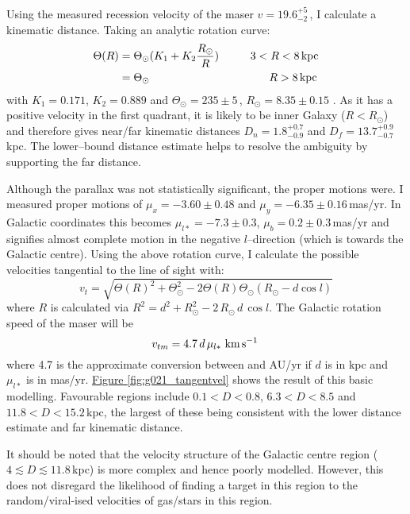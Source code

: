             Using the measured recession velocity of the maser $v=19.6^{+5}_{-2}$\,\kms, I calculate a kinematic distance. Taking an analytic rotation curve:
            \begin{align*}
	            \Theta(R) &= \Theta_\odot (K_1 + K_2\frac{R_\odot}{R}) \hspace{1cm} 3<R<8\,\text{kpc} \\
				          &= \Theta_\odot \hspace{3.8cm} R>8\,\text{kpc}
            \end{align*} 
            with $K_1=0.171$, $K_2=0.889$ \citep{McClure2016} and $\Theta_\odot=235\pm5$\,\kms, $R_\odot=8.35\pm0.15$ \citep{Reid2014}. As it has a positive velocity in the first quadrant, it is likely to be inner Galaxy ($R<R_\odot$) and therefore gives near/far kinematic distances $D_n=1.8^{+0.7}_{-0.9}$ and $D_f=13.7^{+0.9}_{-0.7}$\,kpc. The lower--bound distance estimate helps to resolve the ambiguity by supporting the far distance.
            
            Although the parallax was not statistically significant, the proper motions were. I measured proper motions of $\mu_x=-3.60\pm0.48$ and $\mu_y=-6.35\pm0.16$\,mas/yr. In Galactic coordinates this becomes $\mu_{l*}= -7.3\pm0.3$, $\mu_b=0.2\pm0.3$\,mas/yr and signifies almost complete motion in the negative $l$--direction (which is towards the Galactic centre). Using the above rotation curve, I calculate the possible velocities tangential to the line of sight with:
            \begin{equation*}
                v_t = \sqrt{\Theta(R)^2 + \Theta_\odot^2 - 2\Theta(R)\Theta_\odot\left(R_\odot - d\cos l\right)}
            \end{equation*} where $R$ is calculated via $R^2 = d^2 + R_\odot^2 - 2\,R_\odot\,d\,\cos l$. The Galactic rotation speed of the maser will be $$v_{tm} = 4.7\,d\,\mu_{l*}~\text{km\,s$^{-1}$\,}$$ where 4.7 is the approximate conversion between \kms and AU/yr if $d$ is in kpc and $\mu_{l*}$ is in mas/yr. \hyperref[fig:g021_tangentvel]{Figure \ref*{fig:g021_tangentvel}} shows the result of this basic modelling. Favourable regions include $0.1<D<0.8$, $6.3<D<8.5$ and $11.8<D<15.2$\,kpc, the largest of these being consistent with the lower distance estimate and far kinematic distance.

            It should be noted that the velocity structure of the Galactic centre region ($4\lesssim D\lesssim11.8$\,kpc) is more complex and hence poorly modelled. However, this does not disregard the likelihood of finding a target in this region to the random/viral-ised velocities of gas/stars in this region.
            
